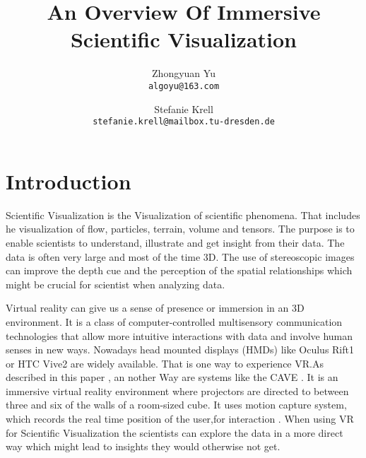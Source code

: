 \documentclass[10pt,twocolumn,letterpaper]{article}
\begin{document}
\title{An Overview Of Immersive Scientific Visualization}

\author{Zhongyuan Yu\\
{\tt\small algoyu@163.com}
\and
Stefanie Krell\\
{\tt\small stefanie.krell@mailbox.tu-dresden.de}
}

\maketitle


\section{Introduction}

Scientific Visualization is the Visualization of scientific phenomena. That includes he visualization of flow, particles, terrain, volume and tensors. The purpose is to enable scientists to understand, illustrate and get insight from their data. The data is often very large and most of the time 3D.  The use of stereoscopic images can improve the depth cue and the perception of the spatial relationships which might be crucial for scientist when analyzing data. 


\setlength{\parindent}{1pc}
Virtual reality can give us a sense of presence or immersion in an 3D environment. It is a class of computer-controlled multisensory communication technologies that allow more intuitive interactions with data and involve human senses in new ways. Nowadays head mounted displays
(HMDs) like Oculus Rift1 or HTC Vive2 are widely available. That is one way to experience VR.As described in this paper \cite{Wiebrands2018}, an nother Way are systems like the CAVE . It is an immersive virtual reality environment where projectors are directed to between three and six of the walls of a room-sized cube. It uses motion capture system, which records the real time position of the user,for interaction . When using VR for Scientific Visualization the scientists can explore the data in a more direct way which might lead to insights they would otherwise not get. 
\end{document}
